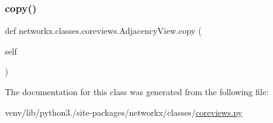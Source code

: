 \mbox{\label{classnetworkx_1_1classes_1_1coreviews_1_1AdjacencyView_a105d9fb30969b1ee9ac75679f50ea352}} 
\subsubsection{\texorpdfstring{copy()}{copy()}}
{\footnotesize\ttfamily def networkx.\+classes.\+coreviews.\+Adjacency\+View.\+copy (\begin{DoxyParamCaption}\item[{}]{self }\end{DoxyParamCaption})}



The documentation for this class was generated from the following file\+:\begin{DoxyCompactItemize}
\item 
venv/lib/python3./site-\/packages/networkx/classes/\hyperlink{coreviews_8py}{coreviews.\+py}\end{DoxyCompactItemize}
